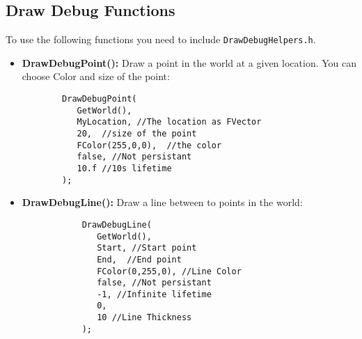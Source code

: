 \documentclass[10pt,a4paper]{article}
\begin{document}
\begin{multicols*}{2}
	\subsection{Draw Debug Functions}
	To use the following functions you need to include \verb|DrawDebugHelpers.h|.
	\begin{itemize}
		\item \textbf{DrawDebugPoint():} Draw a point in the world at a given location. You can choose Color and size of the point:
		\begin{verbatim}
		DrawDebugPoint(
		   GetWorld(), 
		   MyLocation, //The location as FVector
		   20,  //size of the point
		   FColor(255,0,0),  //the color
		   false, //Not persistant
		   10.f //10s lifetime
		);
		\end{verbatim}
		\item \textbf{DrawDebugLine():} Draw a line between to points in  the world:
		\begin{verbatim}
			DrawDebugLine(
			   GetWorld(), 
			   Start, //Start point
			   End,  //End point
			   FColor(0,255,0), //Line Color 
			   false, //Not persistant
			   -1, //Infinite lifetime
			   0,
			   10 //Line Thickness
			);
		\end{verbatim}
	\end{itemize}
	
	\doclicenseImage
\end{multicols*}
\end{document}
